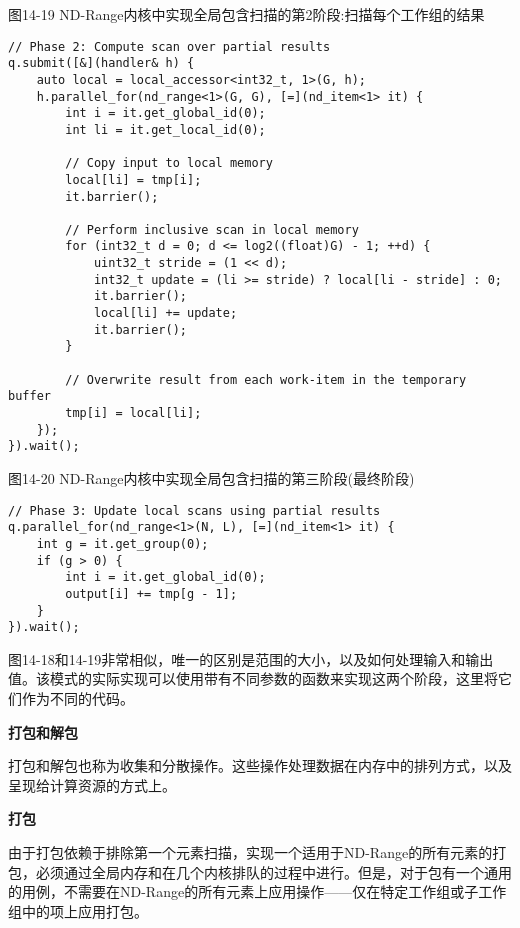 \hspace*{\fill} \par %
图14-19 ND-Range内核中实现全局包含扫描的第2阶段:扫描每个工作组的结果
\begin{lstlisting}[caption={}]
// Phase 2: Compute scan over partial results
q.submit([&](handler& h) {
	auto local = local_accessor<int32_t, 1>(G, h);
	h.parallel_for(nd_range<1>(G, G), [=](nd_item<1> it) {
		int i = it.get_global_id(0);
		int li = it.get_local_id(0);
		
		// Copy input to local memory
		local[li] = tmp[i];
		it.barrier();
		
		// Perform inclusive scan in local memory
		for (int32_t d = 0; d <= log2((float)G) - 1; ++d) {
			uint32_t stride = (1 << d);
			int32_t update = (li >= stride) ? local[li - stride] : 0;
			it.barrier();
			local[li] += update;
			it.barrier();
		}
	
		// Overwrite result from each work-item in the temporary buffer
		tmp[i] = local[li];
	});
}).wait();
\end{lstlisting}

\hspace*{\fill} \par %
图14-20 ND-Range内核中实现全局包含扫描的第三阶段(最终阶段)
\begin{lstlisting}[caption={}]
// Phase 3: Update local scans using partial results
q.parallel_for(nd_range<1>(N, L), [=](nd_item<1> it) {
	int g = it.get_group(0);
	if (g > 0) {
		int i = it.get_global_id(0);
		output[i] += tmp[g - 1];
	}
}).wait();
\end{lstlisting}

图14-18和14-19非常相似，唯一的区别是范围的大小，以及如何处理输入和输出值。该模式的实际实现可以使用带有不同参数的函数来实现这两个阶段，这里将它们作为不同的代码。\par

\hspace*{\fill} \par %
\textbf{打包和解包}

打包和解包也称为收集和分散操作。这些操作处理数据在内存中的排列方式，以及呈现给计算资源的方式上。\par

\hspace*{\fill} \par %
\textbf{打包}

由于打包依赖于排除第一个元素扫描，实现一个适用于ND-Range的所有元素的打包，必须通过全局内存和在几个内核排队的过程中进行。但是，对于包有一个通用的用例，不需要在ND-Range的所有元素上应用操作——仅在特定工作组或子工作组中的项上应用打包。\par

